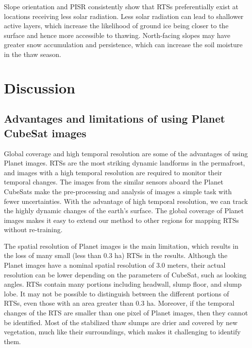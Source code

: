 \documentclass[authoryear,preprint,review,12pt]{elsarticle}
\begin{document}
Slope orientation and PISR consistently show that RTSs preferentially exist at locations receiving less solar radiation. Less solar radiation can lead to shallower active layers, which increase the likelihood of ground ice being closer to the surface and hence more accessible to thawing. North-facing slopes may have greater snow accumulation and persistence, which can increase the soil moisture in the thaw season. 


\section{Discussion}
\label{sec_discussion}

\subsection{Advantages and limitations of using Planet CubeSat images}
\label{subsec_advantage_limitation_planet}

Global coverage and high temporal resolution are some of the advantages of using Planet images. RTSs are the most striking dynamic landforms in the permafrost, and images with a high temporal resolution are required to monitor their temporal changes. The images from the similar sensors aboard the Planet CubeSats make the pre-processing and analysis of images a simple task with fewer uncertainties. With the advantage of high temporal resolution, we can track the highly dynamic changes of the earth's surface. 
The global coverage of Planet images makes it easy to extend our method to other regions for mapping RTSs without re-training. 

The spatial resolution of Planet images is the main limitation, which results in the loss of many small (less than 0.3 ha) RTSs in the results. Although the Planet images have a nominal spatial resolution of 3.0 meters, their actual resolution can be lower depending on the parameters of CubeSat, such as looking angles.
RTSs contain many portions including headwall, slump floor, and slump lobe. It may not be possible to distinguish between the different portions of RTSs, even those with an area greater than 0.3 ha. Moreover, if the temporal changes of the RTS are smaller than one pixel of Planet images, then they cannot be identified. Most of the stabilized thaw slumps are drier and covered by new vegetation, much like their surroundings, which makes it challenging to identify them.
\end{document}
